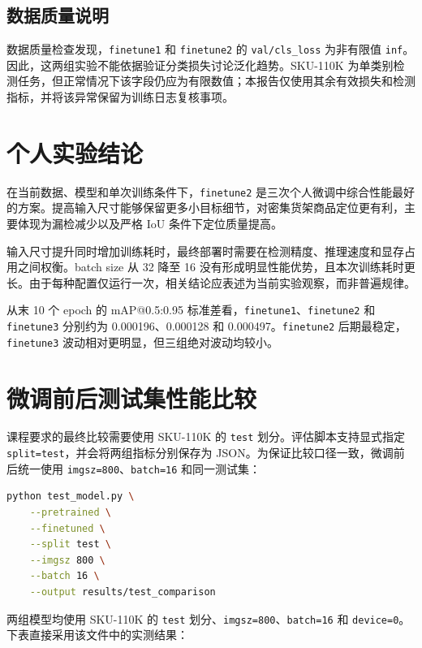 \documentclass[12pt,a4paper]{ctexart}
\begin{document}
\subsection{数据质量说明}

数据质量检查发现，\texttt{finetune1} 和 \texttt{finetune2} 的 \texttt{val/cls\_loss} 为非有限值 \texttt{inf}。因此，这两组实验不能依据验证分类损失讨论泛化趋势。SKU-110K 为单类别检测任务，但正常情况下该字段仍应为有限数值；本报告仅使用其余有效损失和检测指标，并将该异常保留为训练日志复核事项。

\section{个人实验结论}

在当前数据、模型和单次训练条件下，\texttt{finetune2} 是三次个人微调中综合性能最好的方案。提高输入尺寸能够保留更多小目标细节，对密集货架商品定位更有利，主要体现为漏检减少以及严格 IoU 条件下定位质量提高。

输入尺寸提升同时增加训练耗时，最终部署时需要在检测精度、推理速度和显存占用之间权衡。batch size 从 32 降至 16 没有形成明显性能优势，且本次训练耗时更长。由于每种配置仅运行一次，相关结论应表述为当前实验观察，而非普遍规律。

从末 10 个 epoch 的 mAP@0.5:0.95 标准差看，\texttt{finetune1}、\texttt{finetune2} 和 \texttt{finetune3} 分别约为 0.000196、0.000128 和 0.000497。\texttt{finetune2} 后期最稳定，\texttt{finetune3} 波动相对更明显，但三组绝对波动均较小。

\section{微调前后测试集性能比较}

课程要求的最终比较需要使用 SKU-110K 的 \texttt{test} 划分。评估脚本支持显式指定 \texttt{split=test}，并会将两组指标分别保存为 JSON。为保证比较口径一致，微调前后统一使用 \texttt{imgsz=800}、\texttt{batch=16} 和同一测试集：

\begin{lstlisting}[language=bash]
python test_model.py \
    --pretrained \
    --finetuned \
    --split test \
    --imgsz 800 \
    --batch 16 \
    --output results/test_comparison
\end{lstlisting}

两组模型均使用 SKU-110K 的 \texttt{test} 划分、\texttt{imgsz=800}、\texttt{batch=16} 和 \texttt{device=0}。下表直接采用该文件中的实测结果：
\end{document}
